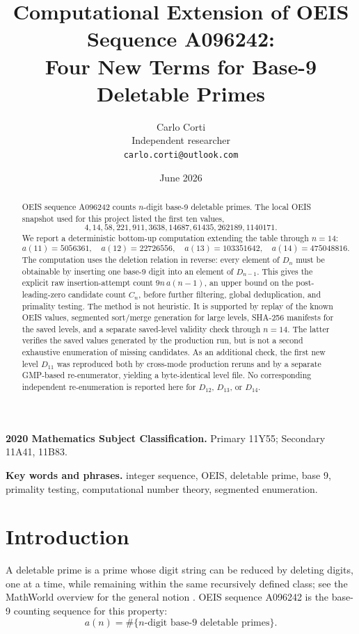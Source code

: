 \documentclass[11pt]{article}
\title{Computational Extension of OEIS Sequence A096242:\\
Four New Terms for Base-9 Deletable Primes}
\author{Carlo Corti\\
Independent researcher\\
\texttt{carlo.corti@outlook.com}}
\date{June 2026}
\theoremstyle{definition}
\theoremstyle{remark}
\begin{document}
\maketitle

\begin{abstract}
OEIS sequence A096242 counts \(n\)-digit base-9 deletable primes.  The
local OEIS snapshot used for this project listed the first ten values,
\[
  4,14,58,221,911,3638,14687,61435,262189,1140171.
\]
We report a deterministic bottom-up computation extending the table through
\(n=14\):
\[
  a(11)=5056361,\quad
  a(12)=22726556,\quad
  a(13)=103351642,\quad
  a(14)=475048816.
\]
The computation uses the deletion relation in reverse: every element of
\(D_n\) must be obtainable by inserting one base-9 digit into an element of
\(D_{n-1}\).  This gives the explicit raw insertion-attempt count
\(9n\,a(n-1)\), an upper bound on the post-leading-zero candidate count
\(C_n\), before further filtering, global deduplication, and primality
testing.
The method is not heuristic.  It is supported by replay of the known OEIS
values, segmented sort/merge generation for large levels, SHA-256 manifests
for the saved levels, and a separate saved-level validity check through
\(n=14\).  The latter verifies the saved values generated by the production
run, but is not a second exhaustive enumeration of missing candidates.  As
an additional check, the first new level \(D_{11}\) was reproduced both by
cross-mode production reruns and by a separate GMP-based re-enumerator,
yielding a byte-identical level file.  No corresponding independent
re-enumeration is reported here for \(D_{12}\), \(D_{13}\), or \(D_{14}\).
\end{abstract}

\noindent\textbf{2020 Mathematics Subject Classification.}
Primary 11Y55; Secondary 11A41, 11B83.

\noindent\textbf{Key words and phrases.}
integer sequence, OEIS, deletable prime, base 9, primality testing,
computational number theory, segmented enumeration.

\section{Introduction}
\label{sec:intro}

A deletable prime is a prime whose digit string can be reduced by deleting
digits, one at a time, while remaining within the same recursively defined
class; see the MathWorld overview for the general notion
\cite{WeissteinDeletable}.  OEIS sequence A096242 is the base-9 counting
sequence for this property:
\[
  a(n)=\#\{\text{\(n\)-digit base-9 deletable primes}\}.
\]
\end{document}
